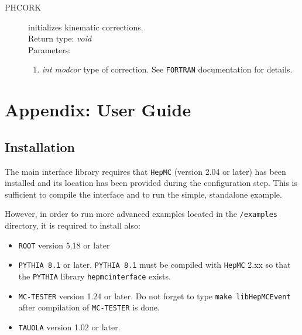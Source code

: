 \documentclass[]{Photos_interface_design}
\begin{document}
\begin{description}
\item[PHCORK] initializes kinematic corrections. \\
  Return type: \textit{void} \\
  Parameters:
  \begin{enumerate}
    \item \textit {int modcor} type of correction. See {\tt FORTRAN} documentation for details.
  \end{enumerate}
\end{description}

\section{Appendix: User Guide}
\label{sec:User Guide}

\subsection{Installation}
\label{sec:Installation}
The main interface library requires that {\tt HepMC} \cite{Dobbs:2001ck} (version 2.04 or later)  has been installed
and its location has been provided during the configuration step. This is sufficient to compile the interface and to run the simple, standalone example.

However, in order to run more advanced examples located in the {\tt /examples} directory, it is required to install also:

\begin{itemize}
  \item {\tt ROOT} \cite{root-install-www} version 5.18 or later
  \item {\tt PYTHIA 8.1} \cite{Sjostrand:2007gs} or later. {\tt PYTHIA 8.1} must be compiled with {\tt HepMC} 2.xx
        so that the {\tt PYTHIA} library {\tt hepmcinterface} exists.
  \item {\tt MC-TESTER} \cite{Golonka:2002rz,Davidson:2008ma} version 1.24 or later.
        Do not forget to type {\tt make libHepMCEvent} after compilation of {\tt MC-TESTER} is done.
  \item {\tt TAUOLA} \cite{Davidson:2010rw} version 1.02 or later.
\end{itemize}
\end{document}
